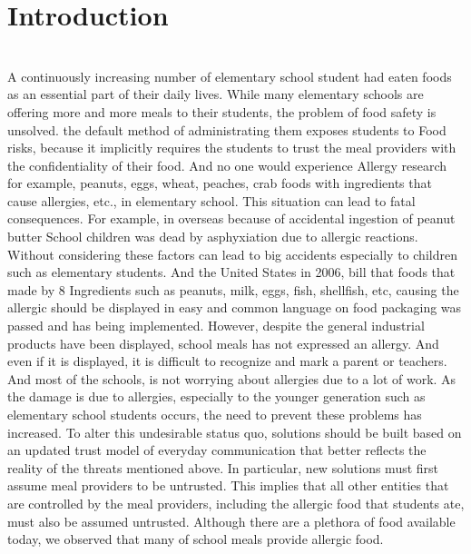 \documentclass[a4paper,11pt]{IEEEtran}
\begin{document}
\section{Introduction}
~\\
{\large
A continuously increasing number of elementary school student had eaten foods as an essential part of their daily lives. While many elementary schools are offering more and more meals to their students, the problem of food safety is unsolved. the default method of administrating them exposes students to Food risks, because it implicitly requires the students to trust the meal providers with the confidentiality of their food.  And no one would experience Allergy research for example, peanuts, eggs, wheat, peaches, crab foods with ingredients that cause allergies, etc., in elementary school. This situation can lead to fatal consequences. For example, in overseas because of accidental ingestion of peanut butter School children was dead by asphyxiation due to allergic reactions. Without considering these factors can lead to big accidents especially to children such as elementary students. And the United States in 2006, bill that foods that made by 8 Ingredients such as peanuts, milk, eggs, fish, shellfish, etc, causing the allergic should be displayed in easy and common language on food packaging was passed and has being implemented. However, despite the general industrial products have been displayed, school meals has not expressed an allergy. And even if it is displayed, it is difficult to recognize and mark a parent or teachers. And most of the schools, is not worrying about allergies due to a lot of work. As the damage is due to allergies, especially to the younger generation such as elementary school students occurs, the need to prevent these problems has increased. To alter this undesirable status quo, solutions should be built based on an updated trust model of everyday communication that better reflects the reality of the threats mentioned above. In particular, new solutions must first assume meal providers to be untrusted. This implies that all other entities that are controlled by the meal providers, including the allergic food that students ate, must also be assumed untrusted. Although there are a plethora of food available today, we observed that many of school meals provide allergic food.
}
~\\
\end{document}
